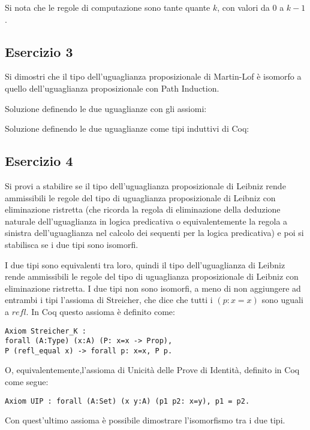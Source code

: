 Si nota che le regole di computazione sono tante quante $k$, con valori da $0$ a $k-1$.

\subsection{Esercizio 3}
\begin{thm}
	Si dimostri che il tipo dell'uguaglianza proposizionale di Martin-Lof è isomorfo a quello dell'uguaglianza proposizionale con Path Induction.
\end{thm}
Soluzione definendo le due uguaglianze con gli assiomi:


Soluzione definendo le due uguaglianze come tipi induttivi di Coq:


\subsection{Esercizio 4}
\begin{thm}
	Si provi a stabilire se il tipo dell'uguaglianza proposizionale di Leibniz rende ammissibili le regole del tipo di uguaglianza proposizionale di Leibniz con eliminazione ristretta (che ricorda la regola di eliminazione della deduzione naturale dell'uguaglianza in logica predicativa o equivalentemente la regola a sinistra dell'uguaglianza nel calcolo dei sequenti per la logica predicativa) e poi si stabilisca se i due tipi sono isomorfi.
\end{thm}
I due tipi sono equivalenti tra loro, quindi il tipo dell'uguaglianza di Leibniz rende ammissibili le regole del tipo di uguaglianza proposizionale di Leibniz con eliminazione ristretta. I due tipi non sono isomorfi, a meno di non aggiungere ad entrambi i tipi l'assioma di Streicher, che dice che tutti i $(p : x = x)$ sono uguali a $refl$. In Coq questo assioma è definito come:
\begin{lstlisting}[language=Coq]
Axiom Streicher_K : 
forall (A:Type) (x:A) (P: x=x -> Prop), 
P (refl_equal x) -> forall p: x=x, P p. 
\end{lstlisting}
O, equivalentemente,l'assioma di Unicità delle Prove di Identità, definito in Coq come segue:
\begin{lstlisting}[language=Coq]
Axiom UIP : forall (A:Set) (x y:A) (p1 p2: x=y), p1 = p2. 
\end{lstlisting}

Con quest'ultimo assioma è possibile dimostrare l'isomorfismo tra i due tipi.

